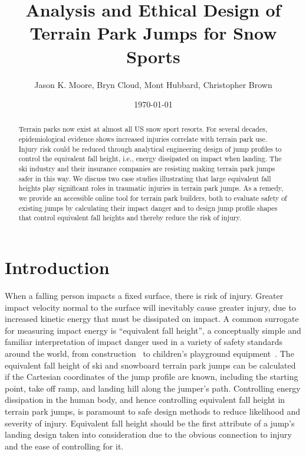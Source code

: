 \documentclass{article}
\title{Analysis and Ethical Design of Terrain Park Jumps for Snow Sports}
\author{Jason K. Moore, Bryn Cloud, Mont Hubbard, Christopher Brown}
\date{\today}
\begin{document}
\maketitle

\begin{abstract}
  Terrain parks now exist at almost all US snow sport resorts. For several
  decades, epidemiological evidence shows increased injuries correlate with
  terrain park use. Injury risk could be reduced through analytical engineering
  design of jump profiles to control the equivalent fall height, i.e., energy
  dissipated on impact when landing. The ski industry and their insurance
  companies are resisting making terrain park jumps safer in this way. We
  discuss two case studies illustrating that large equivalent fall heights play
  significant roles in traumatic injuries in terrain park jumps. As a remedy,
  we provide an accessible online tool for terrain park builders, both to
  evaluate safety of existing jumps by calculating their impact danger and to
  design jump profile shapes that control equivalent fall heights and thereby
  reduce the risk of injury.
\end{abstract}

\section{Introduction}
%
When a falling person impacts a fixed surface, there is risk of injury. Greater
impact velocity normal to the surface will inevitably cause greater injury, due
to increased kinetic energy that must be dissipated on impact. A common
surrogate for measuring impact energy is ``equivalent fall height'', a
conceptually simple and familiar interpretation of impact danger used in a
variety of safety standards around the world, from construction~\cite{OSHA2021}
to children's playground equipment~\cite{Chalmers1996}. The equivalent fall
height of ski and snowboard terrain park jumps can be
calculated~\cite{McNeil2012} if the Cartesian coordinates of the jump profile
are known, including the starting point, take off ramp, and landing hill along
the jumper's path. Controlling energy dissipation in the human body, and hence
controlling equivalent fall height in terrain park jumps, is paramount to safe
design methods to reduce likelihood and severity of injury. Equivalent fall
height should be the first attribute of a jump's landing design taken into
consideration due to the obvious connection to injury and the ease of
controlling for it.
\end{document}
